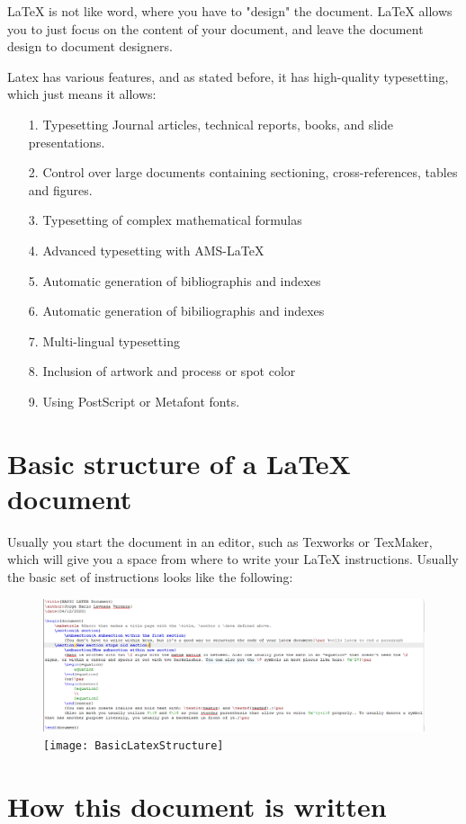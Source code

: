 \documentclass[12pt]{article}
\begin{document}
			{LaTeX is not like word, where you have to "design" the document. LaTeX allows you to just focus on the content of your document, and leave the document design to document designers.}\par
			{Latex has various features, and as stated before, it has high-quality typesetting, which just means it allows:}\par 
			\begin{itemize}
				\item[1.]{Typesetting Journal articles, technical reports, books, and slide presentations.}\par
				\item[2.] {Control over large documents containing sectioning, cross-references, tables and figures.}\par
				\item[3.]{Typesetting of complex mathematical formulas}\par
				\item[4.]{Advanced typesetting with AMS-LaTeX}\par
				\item[5.]{Automatic generation of bibliographis and indexes}\par
				\item[6.]{Automatic generation of bibiliographis and indexes}\par
				\item[7.]{Multi-lingual typesetting}\par
				\item[8.]{Inclusion of artwork and process or spot color}\par
				\item[9.]{Using PostScript or Metafont fonts.}\par
			\end{itemize}
	\section{Basic structure of a LaTeX document}
		{Usually you start the document in an editor, such as Texworks or TexMaker, which will give you a space from where to write your LaTeX instructions. Usually the basic set of instructions looks like the following: }\par
		\begin{center}
			\begin{figure}
				\includegraphics[scale=0.3]{ExampleLatexPicture}
				\texttt{[image: BasicLatexStructure]}
			\end{figure}
		\end{center}
	\section{How this document is written}
\end{document}
